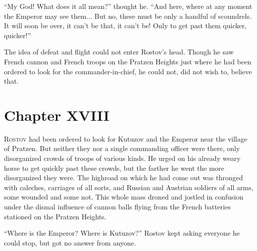 ``My God! What does it all mean?'' thought he. ``And here, where
at any moment the Emperor may see them... But no, these must be
only a handful of scoundrels. It will soon be over, it can't be
that, it can't be! Only to get past them quicker, quicker!''

The idea of defeat and flight could not enter Rostov's
head. Though he saw French cannon and French troops on the
Pratzen Heights just where he had been ordered to look for the
commander-in-chief, he could not, did not wish to, believe that.


\chapter*{Chapter XVIII}
\ifaudio     
{} 
\fi

\lettrine[lines=2, loversize=0.3, lraise=0]{\initfamily R}{ostov}
 had been ordered to look for Kutuzov and the Emperor near
the village of Pratzen. But neither they nor a single commanding
officer were there, only disorganized crowds of troops of various
kinds. He urged on his already weary horse to get quickly past
these crowds, but the farther he went the more disorganized they
were. The highroad on which he had come out was thronged with
caleches, carriages of all sorts, and Russian and Austrian
soldiers of all arms, some wounded and some not. This whole mass
droned and jostled in confusion under the dismal influence of
cannon balls flying from the French batteries stationed on the
Pratzen Heights.

``Where is the Emperor? Where is Kutuzov?'' Rostov kept asking
everyone he could stop, but got no answer from anyone.

